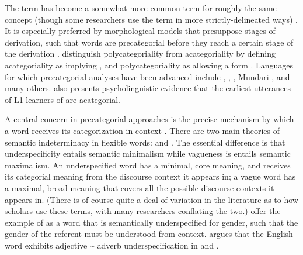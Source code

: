 The term  has become a somewhat more common term for roughly the same concept (though some researchers use the term in more strictly-delineated ways) \parencites[357, 362--364]{EvansOsada2005}{Bisang2008}{Bisang2013}. It is especially preferred by morphological models that presuppose stages of derivation, such that words are precategorial before they reach a certain stage of the derivation \parencites{HalleMarantz1994}{Arad2005}{McGinnisArchibald2016}{Siddiqi2018}. \textcite[5]{VapnarskyVeneziano2017a} distinguish polycategoriality from acategoriality by defining acategoriality as implying , and polycategoriality as allowing a form . Languages for which precategorial analyses have been advanced include  \parencite{Haag2017},  \parencite{McGregor2013},  \parencite{FranchettoSantos2017}, Mundari \parencite{HengeveldRijkhoff2005}, and many others. \textcite{Pfeiler2017} also presents psycholinguistic evidence that the earliest utterances of L1 learners of  are acategorial.

A central concern in precategorial approaches is the precise mechanism by which a word receives its categorization in context \parencite[§3.7]{HengeveldRijkhoffSiewierska2004}. There are two main theories of semantic indeterminacy in flexible words:  \parencites{Farrell2001}{RijkhoffLier2013} and  \parencites{Tuggy1993}{HengeveldRijkhoffSiewierska2004}{HengeveldRijkhoff2005}. The essential difference is that underspecificity entails semantic minimalism while vagueness is entails semantic maximalism. An underspecified word has a minimal, core meaning, and receives its categorial meaning from the discourse context it appears in; a vague word has a maximal, broad meaning that covers all the possible discourse contexts it appears in. (There is of course quite a deal of variation in the literature as to how scholars use these terms, with many researchers conflating the two.) \textcite[414]{HengeveldRijkhoff2005} offer the example of   as a word that is semantically underspecified for gender, such that the gender of the referent must be understood from context. \textcite{Denison2018} argues that the English word  exhibits adjective {\textasciitilde} adverb underspecification in  and .

